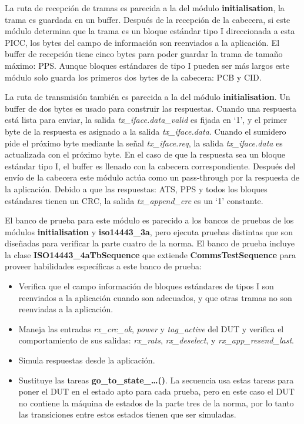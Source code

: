 \documentclass[a4paper, twoside, 11pt]{report}
\begin{document}
La ruta de recepción de tramas es parecida a la del módulo \textbf{initialisation}, la trama es guardada en un buffer. Después de la recepción de la cabecera, si este módulo determina que la trama es un bloque estándar tipo I direccionada a esta PICC, los bytes del campo de información son reenviados a la aplicación. El buffer de recepción tiene cinco bytes para poder guardar la trama de tamaño máximo: PPS. Aunque bloques estándares de tipo I pueden ser más largos este módulo solo guarda los primeros dos bytes de la cabecera: PCB y CID.

La ruta de transmisión también es parecida a la del módulo \textbf{initialisation}. Un buffer de dos bytes es usado para construir las respuestas. Cuando una respuesta está lista para enviar, la salida \textit{tx\_iface.data\_valid} es fijada en ‘1’, y el primer byte de la respuesta es asignado a la salida \textit{tx\_iface.data}. Cuando el sumidero pide el próximo byte mediante la señal \textit{tx\_iface.req}, la salida \textit{tx\_iface.data} es actualizada con el próximo byte. En el caso de que la respuesta sea un bloque estándar tipo I, el buffer es llenado con la cabecera correspondiente. Después del envío de la cabecera este módulo actúa como un pass-through por la respuesta de la aplicación. Debido a que las respuestas: ATS, PPS y todos los bloques estándares tienen un CRC, la salida \textit{tx\_append\_crc} es un ‘1’ constante.

El banco de prueba para este módulo es parecido a los bancos de pruebas de los módulos \textbf{initialisation} y \textbf{iso14443\_3a}, pero ejecuta pruebas distintas que son diseñadas para verificar la parte cuatro de la norma. El banco de prueba incluye la clase \textbf{ISO14443\_4aTbSequence} que extiende \textbf{CommsTestSequence} para proveer habilidades específicas a este banco de prueba:

\begin{itemize}
  \item Verifica que el campo información de bloques estándares de tipos I son reenviados a la aplicación cuando son adecuados, y que otras tramas no son reenviadas a la aplicación.
  \item Maneja las entradas \textit{rx\_crc\_ok}, \textit{power} y \textit{tag\_active} del DUT y verifica el comportamiento de sus salidas: \textit{rx\_rats}, \textit{rx\_deselect}, y \textit{rx\_app\_resend\_last}.
  \item Simula respuestas desde la aplicación.
  \item Sustituye las tareas \textbf{go\_to\_state\_…()}. La secuencia usa estas tareas para poner el DUT en el estado apto para cada prueba, pero en este caso el DUT no contiene la máquina de estados de la parte tres de la norma, por lo tanto las transiciones entre estos estados tienen que ser simuladas.
\end{itemize}
\end{document}

